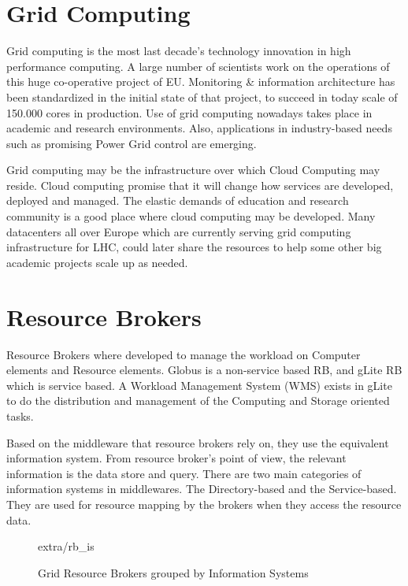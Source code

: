 
\section{Grid Computing}
Grid computing \cite{li2005grid} is the most last decade's technology innovation in high performance computing. A large number of scientists work on the operations of this huge co-operative project of EU. Monitoring \& information architecture \cite{fisher2002datagrid} has been standardized in the initial state of that project, to succeed in today scale of 150.000 cores in production. Use of grid computing nowadays takes place in academic and research environments. Also, applications in industry-based needs such as promising Power Grid control \cite{Taylor2006} are emerging.

Grid computing may be the infrastructure over which Cloud Computing may reside. Cloud computing promise that it will change how services are developed, deployed and managed. The elastic demands of education and research community is a good place where cloud computing may be developed. Many datacenters all over Europe which are currently serving grid computing infrastructure for LHC, could later share the resources to help some other big academic projects scale up as needed.

\section{Resource Brokers}
Resource Brokers \cite{Kertesz06ataxonomy} where developed to manage the workload on Computer elements and Resource elements. Globus is a non-service based RB, and gLite RB which is service based. A Workload Management System (WMS) exists in gLite to do the distribution and management of the Computing and Storage oriented tasks.

Based on the middleware that resource brokers rely on, they use the equivalent information system. From resource broker's point of view, the relevant information is the data store and query. There are two main categories of information systems in middlewares. The Directory-based and the Service-based. They are used for resource mapping by the brokers when they access the resource data.

\begin{figure}[h]
\begin{center}
 {extra/rb_is}
\caption{Grid Resource Brokers grouped by Information Systems\cite{Kertesz06ataxonomy}}
\end{center}
\end{figure}

